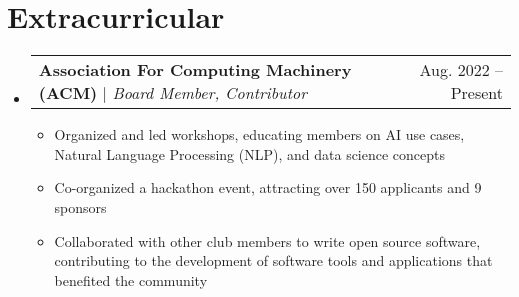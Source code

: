 \documentclass[letterpaper,11pt]{article}
\makeatletter
\newcommand{\resumeItem}[1]{
  \item\small{
    {#1 \vspace{-2pt}}
  }
}
\newcommand{\resumeProjectHeading}[2]{
    \item
    \begin{tabular*}{0.97\textwidth}{l@{\extracolsep{\fill}}r}
      \small#1 & #2 \\
    \end{tabular*}\vspace{-7pt}
}
\newcommand{\resumeSubHeadingListStart}{\begin{itemize}[leftmargin=0.15in, label={}]}
\newcommand{\resumeSubHeadingListEnd}{\end{itemize}}
\newcommand{\resumeItemListStart}{\begin{itemize}}
\newcommand{\resumeItemListEnd}{\end{itemize}\vspace{-5pt}}
\makeatother
\begin{document}
\section{Extracurricular}
    \resumeSubHeadingListStart
      \resumeProjectHeading
          {\textbf{Association For Computing Machinery (ACM) } $|$ \emph{Board Member, Contributor}}{Aug. 2022 -- Present}
          \resumeItemListStart
            \resumeItem{Organized and led workshops, educating members on AI use cases, Natural Language Processing (NLP), and data science concepts}
            \resumeItem{Co-organized a hackathon event, attracting over 150 applicants and 9 sponsors}
            \resumeItem{Collaborated with other club members to write open source software, contributing to the development of software tools and applications that benefited the community}
          \resumeItemListEnd
    \resumeSubHeadingListEnd


\end{document}

